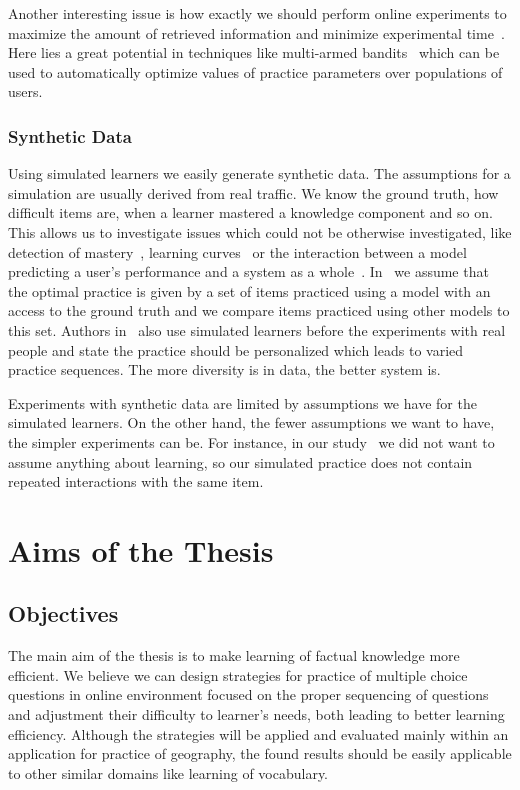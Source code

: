 \documentclass[table,color,cover,twoside,nolot,nolof]{fithesis3/fithesis3}
\begin{document}
Another interesting issue is how exactly we should perform online
experiments to maximize the amount of retrieved information and minimize
experimental time~\cite{liu2014towards}. Here lies a great potential in techniques
like multi-armed bandits~\cite{liu2014trading} which can be used to
automatically optimize values of practice parameters over populations of users.

\subsection{Synthetic Data}

Using simulated learners we easily generate synthetic data. The assumptions for
a simulation are usually derived from real traffic. We know the ground truth, how
difficult items are, when a learner mastered a knowledge component and so on.
This allows us to investigate issues which could not be otherwise investigated, like
detection of mastery~\cite{fancsali2013optimal}, learning
curves~\cite{fancsali2013simulated} or the interaction between a model
predicting a user's performance and a system as a
whole~\cite{niznan2015exploring}. In~\cite{niznan2015exploring} we assume that
the optimal practice is given by a set of items practiced using a model with an
access to the ground truth and we compare items practiced using other models to
this set. Authors in~\cite{lopes2015multi} also use simulated learners before
the experiments with real people and state the practice should be personalized
which leads to varied practice sequences. The more diversity is in data, the better
system is.

Experiments with synthetic data are limited by assumptions we have for the
simulated learners. On the other hand, the fewer assumptions we want to have,
the simpler experiments can be. For instance, in our
study~\cite{niznan2015exploring} we did not want to assume anything about
learning, so our simulated practice does not contain repeated interactions with
the same item.

\chapter{Aims of the Thesis}
\label{chapter:aims_of_the_thesis}

\section{Objectives}

The main aim of the thesis is to make learning of factual knowledge more
efficient. We believe we can design strategies for practice of
multiple choice questions in online environment focused on the proper
sequencing of questions and adjustment their difficulty to learner's needs,
both leading to better learning efficiency. Although the strategies will be
applied and evaluated mainly within an application for practice of geography,
the found results should be easily applicable to other similar domains like
learning of vocabulary.
\end{document}
